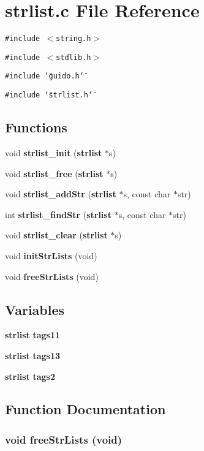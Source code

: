 \section{strlist.c File Reference}
\label{strlist_8c}
{\tt \#include $<$string.h$>$}\par
{\tt \#include $<$stdlib.h$>$}\par
{\tt \#include \char`\"{}guido.h\char`\"{}}\par
{\tt \#include \char`\"{}strlist.h\char`\"{}}\par
\subsection*{Functions}
\begin{CompactItemize}
\item 
void {\bf strlist\_\-init} ({\bf strlist} $\ast$s)
\item 
void {\bf strlist\_\-free} ({\bf strlist} $\ast$s)
\item 
void {\bf strlist\_\-add\-Str} ({\bf strlist} $\ast$s, const char $\ast$str)
\item 
int {\bf strlist\_\-find\-Str} ({\bf strlist} $\ast$s, const char $\ast$str)
\item 
void {\bf strlist\_\-clear} ({\bf strlist} $\ast$s)
\item 
void {\bf init\-Str\-Lists} (void)
\item 
void {\bf free\-Str\-Lists} (void)
\end{CompactItemize}
\subsection*{Variables}
\begin{CompactItemize}
\item 
{\bf strlist} {\bf tags11}
\item 
{\bf strlist} {\bf tags13}
\item 
{\bf strlist} {\bf tags2}
\end{CompactItemize}


\subsection{Function Documentation}
\subsubsection{\setlength{\rightskip}{0pt plus 5cm}void free\-Str\-Lists (void)}\label{strlist_8c_a9}


